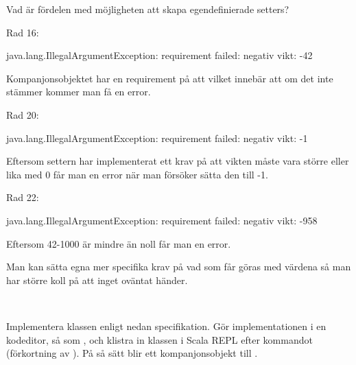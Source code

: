 \Subtask\Pen Vad är fördelen med möjligheten att skapa egendefinierade setters?

\SOLUTION


\TaskSolved \what


\SubtaskSolved  Rad 16:
\begin{REPL}
	java.lang.IllegalArgumentException: requirement failed: negativ vikt: -42
\end{REPL}
Kompanjonsobjektet har en requirement på att  vilket innebär att om det inte stämmer kommer man få en error.

Rad 20:
\begin{REPL}
	java.lang.IllegalArgumentException: requirement failed: negativ vikt: -1
\end{REPL}
Eftersom settern har implementerat ett krav på att vikten måste vara större eller lika med 0 får man en error när man försöker sätta den till -1.

Rad 22:
\begin{REPL}
	java.lang.IllegalArgumentException: requirement failed: negativ vikt: -958
\end{REPL}
Eftersom 42-1000 är mindre än noll får man en error.

\SubtaskSolved  Man kan sätta egna mer specifika krav på vad som får göras med värdena så man har större koll på att inget oväntat händer.


\QUESTEND









\QUESTBEGIN

\Task \label{task:Square} \what~

\Subtask Implementera klassen  enligt nedan specifikation. Gör  implementationen i en kodeditor, så som , och klistra in klassen i Scala REPL efter kommandot  (förkortning av ). På så sätt blir  ett kompanjonsobjekt till .

